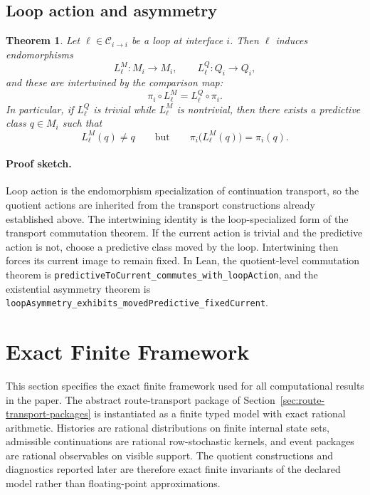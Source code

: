\documentclass[11pt]{article}
\newcommand{\CurrentQ}{Q}
\newcommand{\PredictiveQ}{M}
\newtheorem{theorem}{Theorem}[section]
\theoremstyle{definition}
\begin{document}
\subsection{Loop action and asymmetry}\label{subsec:thm-loops}
\begin{theorem}\label{thm:loop-asymmetry}
Let $\ell\in\mathcal{C}_{i\to i}$ be a loop at interface $i$. Then $\ell$ induces endomorphisms
\[
L^{\PredictiveQ}_{\ell} : \PredictiveQ_i \to \PredictiveQ_i,
\qquad
L^{\CurrentQ}_{\ell} : \CurrentQ_i \to \CurrentQ_i,
\]
and these are intertwined by the comparison map:
\[
\pi_i \circ L^{\PredictiveQ}_{\ell}
=
L^{\CurrentQ}_{\ell} \circ \pi_i.
\]
In particular, if $L^{\CurrentQ}_{\ell}$ is trivial while $L^{\PredictiveQ}_{\ell}$ is nontrivial, then there exists a predictive class $q\in\PredictiveQ_i$ such that
\[
L^{\PredictiveQ}_{\ell}(q)\neq q
\qquad\text{but}\qquad
\pi_i\bigl(L^{\PredictiveQ}_{\ell}(q)\bigr)=\pi_i(q).
\]
\end{theorem}

\paragraph{Proof sketch.}
Loop action is the endomorphism specialization of continuation transport, so the quotient actions are inherited from the transport constructions already established above. The intertwining identity is the loop-specialized form of the transport commutation theorem. If the current action is trivial and the predictive action is not, choose a predictive class moved by the loop. Intertwining then forces its current image to remain fixed. In Lean, the quotient-level commutation theorem is \texttt{predictiveToCurrent\_commutes\_with\_loopAction}, and the existential asymmetry theorem is \texttt{loopAsymmetry\_exhibits\_movedPredictive\_fixedCurrent}.

\section{Exact Finite Framework}\label{sec:exact-finite-framework}
This section specifies the exact finite framework used for all computational results in the paper. The abstract route-transport package of Section~\ref{sec:route-transport-packages} is instantiated as a finite typed model with exact rational arithmetic. Histories are rational distributions on finite internal state sets, admissible continuations are rational row-stochastic kernels, and event packages are rational observables on visible support. The quotient constructions and diagnostics reported later are therefore exact finite invariants of the declared model rather than floating-point approximations.
\end{document}
